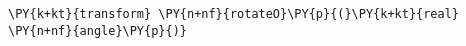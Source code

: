 \begin{Verbatim}[commandchars=\\\{\}]
    \PY{k+kt}{transform} \PY{n+nf}{rotateO}\PY{p}{(}\PY{k+kt}{real} \PY{n+nf}{angle}\PY{p}{)}
\end{Verbatim}
